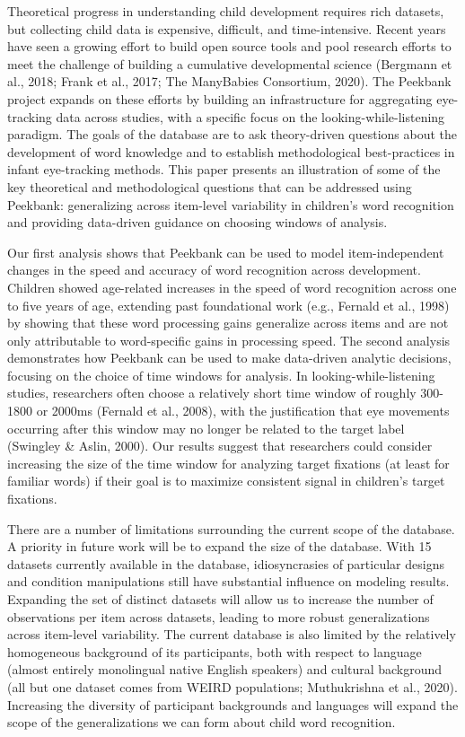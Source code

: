 \documentclass[10pt, letterpaper]{article}
\begin{document}
Theoretical progress in understanding child development requires rich
datasets, but collecting child data is expensive, difficult, and
time-intensive. Recent years have seen a growing effort to build open
source tools and pool research efforts to meet the challenge of building
a cumulative developmental science (Bergmann et al., 2018; Frank et al.,
2017; The ManyBabies Consortium, 2020). The Peekbank project expands on
these efforts by building an infrastructure for aggregating eye-tracking
data across studies, with a specific focus on the
looking-while-listening paradigm. The goals of the database are to ask
theory-driven questions about the development of word knowledge and to
establish methodological best-practices in infant eye-tracking methods.
This paper presents an illustration of some of the key theoretical and
methodological questions that can be addressed using Peekbank:
generalizing across item-level variability in children's word
recognition and providing data-driven guidance on choosing windows of
analysis.

Our first analysis shows that Peekbank can be used to model
item-independent changes in the speed and accuracy of word recognition
across development. Children showed age-related increases in the speed
of word recognition across one to five years of age, extending past
foundational work (e.g., Fernald et al., 1998) by showing that these
word processing gains generalize across items and are not only
attributable to word-specific gains in processing speed. The second
analysis demonstrates how Peekbank can be used to make data-driven
analytic decisions, focusing on the choice of time windows for analysis.
In looking-while-listening studies, researchers often choose a
relatively short time window of roughly 300-1800 or 2000ms (Fernald et
al., 2008), with the justification that eye movements occurring after
this window may no longer be related to the target label (Swingley \&
Aslin, 2000). Our results suggest that researchers could consider
increasing the size of the time window for analyzing target fixations
(at least for familiar words) if their goal is to maximize consistent
signal in children's target fixations.

There are a number of limitations surrounding the current scope of the
database. A priority in future work will be to expand the size of the
database. With 15 datasets currently available in the database,
idiosyncrasies of particular designs and condition manipulations still
have substantial influence on modeling results. Expanding the set of
distinct datasets will allow us to increase the number of observations
per item across datasets, leading to more robust generalizations across
item-level variability. The current database is also limited by the
relatively homogeneous background of its participants, both with respect
to language (almost entirely monolingual native English speakers) and
cultural background (all but one dataset comes from WEIRD populations;
Muthukrishna et al., 2020). Increasing the diversity of participant
backgrounds and languages will expand the scope of the generalizations
we can form about child word recognition.
\end{document}
